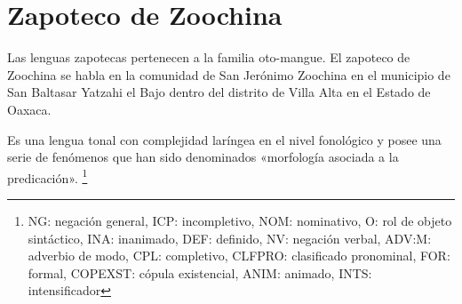 \section*{Zapoteco de Zoochina}

\noindent Las lenguas zapotecas pertenecen a la familia oto-mangue. El zapoteco de Zoochina se habla en la comunidad de San Jerónimo Zoochina en el municipio de San Baltasar Yatzahi el Bajo dentro del distrito de Villa Alta en el Estado de Oaxaca. 

Es una lengua tonal con complejidad laríngea en el nivel fonológico y posee una serie de fenómenos que han sido denominados «morfología asociada a la predicación». \footnote{NG: negación general, ICP: incompletivo, NOM: nominativo, O: rol de objeto sintáctico, INA: inanimado, DEF: definido, NV: negación verbal, ADV:M: adverbio de modo, CPL: completivo, CLFPRO: clasificado pronominal, FOR: formal, COPEXST: cópula existencial, ANIM: animado, INTS: intensificador} \vspace{0.5cm}


